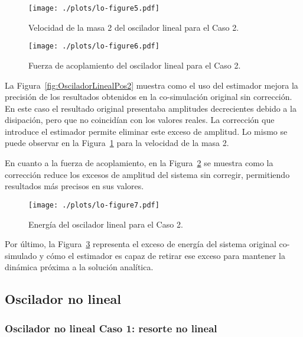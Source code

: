 \begin{figure}[ht!]\centering
	\texttt{[image: ./plots/lo-figure5.pdf]}
	\caption{Velocidad de la masa 2 del oscilador lineal para el Caso 2.}
	\label{fig:OsciladorLinealVel2}
\end{figure}

\begin{figure}[ht!]\centering
	\texttt{[image: ./plots/lo-figure6.pdf]}
	\caption{Fuerza de acoplamiento del oscilador lineal para el Caso 2.}
	\label{fig:OsciladorLinealFor2}
\end{figure}

La Figura~\ref{fig:OsciladorLinealPos2} muestra como el uso del estimador mejora la precisión de los resultados obtenidos en la co-simulación original sin corrección.
En este caso el resultado original presentaba amplitudes decrecientes debido a la disipación, pero que no coincidían con los valores reales.
La corrección que introduce el estimador permite eliminar este exceso de amplitud.
Lo mismo se puede observar en la Figura~\ref{fig:OsciladorLinealVel2} para la velocidad de la masa 2.

En cuanto a la fuerza de acoplamiento, en la Figura~\ref{fig:OsciladorLinealFor2} se muestra como la corrección reduce los excesos de amplitud del sistema sin corregir, permitiendo resultados más precisos en sus valores.

\begin{figure}[ht!]\centering
	\texttt{[image: ./plots/lo-figure7.pdf]}
	\caption{Energía del oscilador lineal para el Caso 2.}
	\label{fig:OsciladorLinealEnergia2}
\end{figure}

Por último, la Figura~\ref{fig:OsciladorLinealEnergia2} representa el exceso de energía del sistema original co-simulado y cómo el estimador es capaz de retirar ese exceso para mantener la dinámica próxima a la solución analítica.



\subsection{Oscilador no lineal}
\label{sec:res_osciladorNL}

\subsubsection{Oscilador no lineal Caso 1: resorte no lineal}
\label{subsec:res_osciladorNL1}


